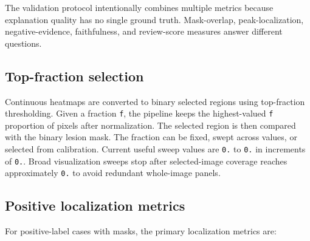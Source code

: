 The validation protocol intentionally combines multiple metrics because
explanation quality has no single ground truth. Mask-overlap,
peak-localization, negative-evidence, faithfulness, and review-score
measures answer different questions.

\hypertarget{top-fraction-selection}{%
	\subsection{Top-fraction selection}\label{top-fraction-selection}}

Continuous heatmaps are converted to binary selected regions using
top-fraction thresholding. Given a fraction \texttt{f}, the pipeline
keeps the highest-valued \texttt{f} proportion of pixels after
normalization. The selected region is then compared with the binary
lesion mask. The fraction can be fixed, swept across values, or selected
from calibration. Current useful sweep values are \texttt{0.} to
\texttt{0.} in increments of \texttt{0.}. Broad visualization sweeps
stop after selected-image coverage reaches approximately \texttt{0.}
to avoid redundant whole-image panels.

\hypertarget{positive-localization-metrics}{%
	\subsection{Positive localization
		metrics}\label{positive-localization-metrics}}

For positive-label cases with masks, the primary localization metrics
are:

